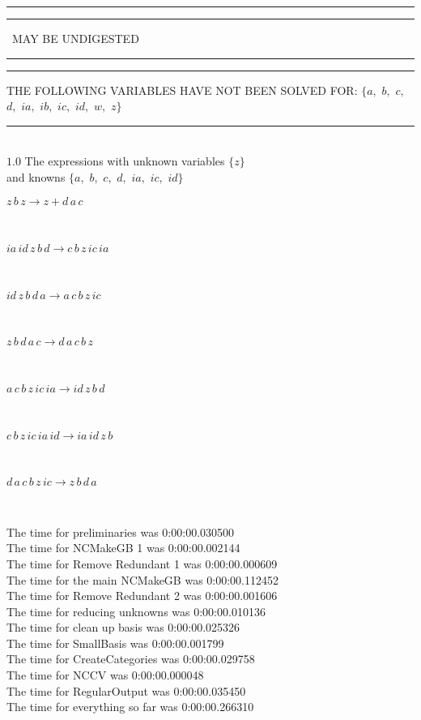 \documentclass[rep10,leqno]{report}
\begin{document}
\rule[2pt]{1.45in}{4pt}\hfil\break
\rule[2pt]{2.18in}{4pt}
\ MAY BE UNDIGESTED\ 
\rule[2pt]{2.18in}{4pt}\hfil\break
\rule[2pt]{6in}{4pt}\hfil\break
THE FOLLOWING VARIABLES HAVE NOT BEEN SOLVED FOR:\hfil\break
$\{a,
$ $
b,
$ $
c,
$ $
d,
$ $
ia,
$ $
ib,
$ $
ic,
$ $
id,
$ $
w,
$ $
z\}$
\smallskip\\
\rule[3pt]{6in}{.7pt}\\
$1.0$  The expressions with unknown variables $\{z\}$\\
and knowns $\{a,
$ $
b,
$ $
c,
$ $
d,
$ $
ia,
$ $
ic,
$ $
id\}$\smallskip\\
\begin{minipage}{6in}
$
z\,
 b\,
 z\rightarrow z + d\,
 a\,
 c
$
\end{minipage}\medskip \\
\begin{minipage}{6in}
$
ia\,
 id\,
 z\,
 b\,
 d\rightarrow c\,
 b\,
 z\,
 ic\,
 ia
$
\end{minipage}\medskip \\
\begin{minipage}{6in}
$
id\,
 z\,
 b\,
 d\,
 a\rightarrow a\,
 c\,
 b\,
 z\,
 ic
$
\end{minipage}\medskip \\
\begin{minipage}{6in}
$
z\,
 b\,
 d\,
 a\,
 c\rightarrow d\,
 a\,
 c\,
 b\,
 z
$
\end{minipage}\medskip \\
\begin{minipage}{6in}
$
a\,
 c\,
 b\,
 z\,
 ic\,
 ia\rightarrow id\,
 z\,
 b\,
 d
$
\end{minipage}\medskip \\
\begin{minipage}{6in}
$
c\,
 b\,
 z\,
 ic\,
 ia\,
 id\rightarrow ia\,
 id\,
 z\,
 b
$
\end{minipage}\medskip \\
\begin{minipage}{6in}
$
d\,
 a\,
 c\,
 b\,
 z\,
 ic\rightarrow z\,
 b\,
 d\,
 a
$
\end{minipage}\\
\vspace{10pt}

\noindent
The time for preliminaries was 0:00:00.030500\\
The time for NCMakeGB 1 was 0:00:00.002144\\
The time for Remove Redundant 1 was 0:00:00.000609\\
The time for the main NCMakeGB was 0:00:00.112452\\
The time for Remove Redundant 2 was 0:00:00.001606\\
The time for reducing unknowns was 0:00:00.010136\\
The time for clean up basis was 0:00:00.025326\\
The time for SmallBasis was 0:00:00.001799\\
The time for CreateCategories was 0:00:00.029758\\
The time for NCCV was 0:00:00.000048\\
The time for RegularOutput was 0:00:00.035450\\
The time for everything so far was 0:00:00.266310\\
\end{document}
